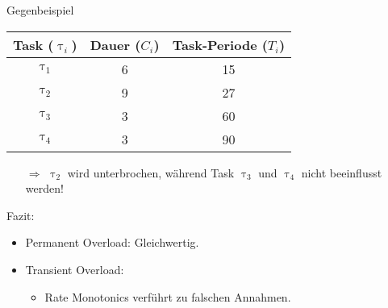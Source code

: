 \newcommand{\showRMSlideRob}[1] {\begin{frame}{Gegenbeispiel}
	\begin{center}
		\begin{tabular}{c||c|c}
			Task ($\uptau_i$) & Dauer ($C_i$) & Task-Periode ($T_i$)\\\hline\hline
			$\uptau_1$ & 6 & 15\\
			$\uptau_2$ & 9 & 27\\
			$\uptau_3$ & 3 & 60\\
			$\uptau_4$ & 3 & 90
		\end{tabular}
	\end{center}
	
	
	\begin{itemize}
		\item[$\Rightarrow$] $\uptau_2$ wird unterbrochen, während Task $\uptau_3$ und $\uptau_4$ nicht beeinflusst werden!
	\end{itemize}
\end{frame}}

%
{%
	\showRMSlideRob{\arabic{ct}}
}


\begin{frame}{Fazit:}
	\begin{itemize}
		\item Permanent Overload: Gleichwertig.
		\item Transient Overload:
		\begin{itemize}
			\item Rate Monotonics verführt zu falschen Annahmen.
		\end{itemize}
	\end{itemize}
\end{frame}
